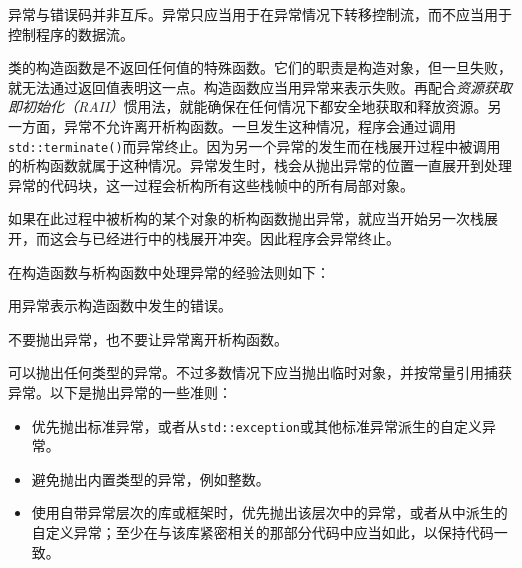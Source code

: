 
\begin{myNote}[tip]
异常与错误码并非互斥。异常只应当用于在异常情况下转移控制流，而不应当用于控制程序的数据流。
\end{myNote}



类的构造函数是不返回任何值的特殊函数。它们的职责是构造对象，但一旦失败，就无法通过返回值表明这一点。构造函数应当用异常来表示失败。再配合\textit{资源获取即初始化（RAII）}惯用法，就能确保在任何情况下都安全地获取和释放资源。另一方面，异常不允许离开析构函数。一旦发生这种情况，程序会通过调用\texttt{std::\allowbreak{}terminate()}而异常终止。因为另一个异常的发生而在栈展开过程中被调用的析构函数就属于这种情况。异常发生时，栈会从抛出异常的位置一直展开到处理异常的代码块，这一过程会析构所有这些栈帧中的所有局部对象。



如果在此过程中被析构的某个对象的析构函数抛出异常，就应当开始另一次栈展开，而这会与已经进行中的栈展开冲突。因此程序会异常终止。



\begin{myNote}[tip]
在构造函数与析构函数中处理异常的经验法则如下：

\par\noindent 用异常表示构造函数中发生的错误。

\par\noindent 不要抛出异常，也不要让异常离开析构函数。
\end{myNote}



可以抛出任何类型的异常。不过多数情况下应当抛出临时对象，并按常量引用捕获异常。以下是抛出异常的一些准则：



\begin{itemize}
\item 优先抛出标准异常，或者从\texttt{std::\allowbreak{}exception}或其他标准异常派生的自定义异常。



\item 避免抛出内置类型的异常，例如整数。



\item 使用自带异常层次的库或框架时，优先抛出该层次中的异常，或者从中派生的自定义异常；至少在与该库紧密相关的那部分代码中应当如此，以保持代码一致。

\end{itemize}


